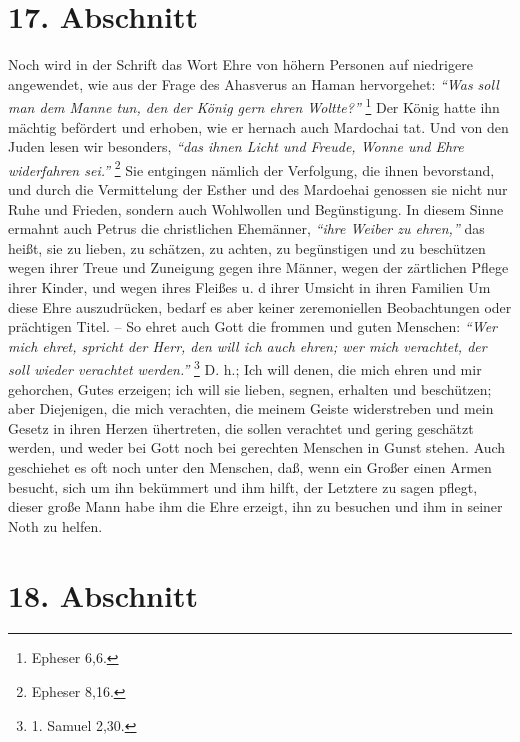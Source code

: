 \section{17. Abschnitt} \label{kap9_ab17}

Noch wird in der Schrift das Wort Ehre von höhern Personen auf niedrigere
angewendet, wie aus der Frage des Ahasverus an
Haman hervorgehet:
\textit{"`Was soll man
dem Manne tun, den der König gern ehren Woltte?"'}
\footnote{Epheser 6,6.}
Der König hatte ihn mächtig befördert und erhoben, wie er hernach auch Mardochai
tat. Und von den Juden lesen wir besonders,
\textit{"`das ihnen Licht und Freude,
Wonne und Ehre widerfahren sei."'}
\footnote{Epheser 8,16.}
Sie entgingen nämlich der
Verfolgung, die ihnen bevorstand, und durch die Vermittelung der
Esther und des
Mardoehai genossen sie nicht nur Ruhe und Frieden,
sondern auch Wohlwollen und
Begünstigung. In diesem Sinne ermahnt auch Petrus die christlichen Ehemänner,
\textit{"`ihre Weiber zu ehren,"'} das heißt, sie zu lieben,
zu schätzen, zu achten, zu
begünstigen und zu beschützen wegen ihrer Treue und Zuneigung gegen ihre Männer,
wegen der zärtlichen Pflege ihrer Kinder, und wegen ihres Fleißes u. d ihrer
Umsicht in ihren Familien Um diese Ehre auszudrücken, bedarf es aber keiner
zeremoniellen Beobachtungen oder prächtigen Titel. -- So ehret auch Gott die
frommen und guten Menschen:
\textit{"`Wer mich ehret, spricht der Herr, den will ich
auch ehren; wer mich verachtet, der soll wieder verachtet werden."'}
\footnote{1. Samuel 2,30.}
D. h.; Ich will denen, die mich ehren und mir gehorchen, Gutes
erzeigen; ich will sie lieben, segnen, erhalten und beschützen; aber Diejenigen,
die mich verachten, die meinem Geiste widerstreben und mein Gesetz in ihren
Herzen ühertreten, die sollen verachtet und
gering geschätzt werden, und weder
bei Gott noch bei gerechten Menschen in Gunst stehen. Auch geschiehet es oft
noch unter den Menschen, daß, wenn ein Großer einen Armen besucht, sich um ihn
bekümmert und ihm hilft, der Letztere zu sagen pflegt, dieser große Mann habe
ihm die Ehre erzeigt, ihn zu besuchen und ihm in seiner Noth zu helfen.

\section{18. Abschnitt} \label{kap9_ab18}

